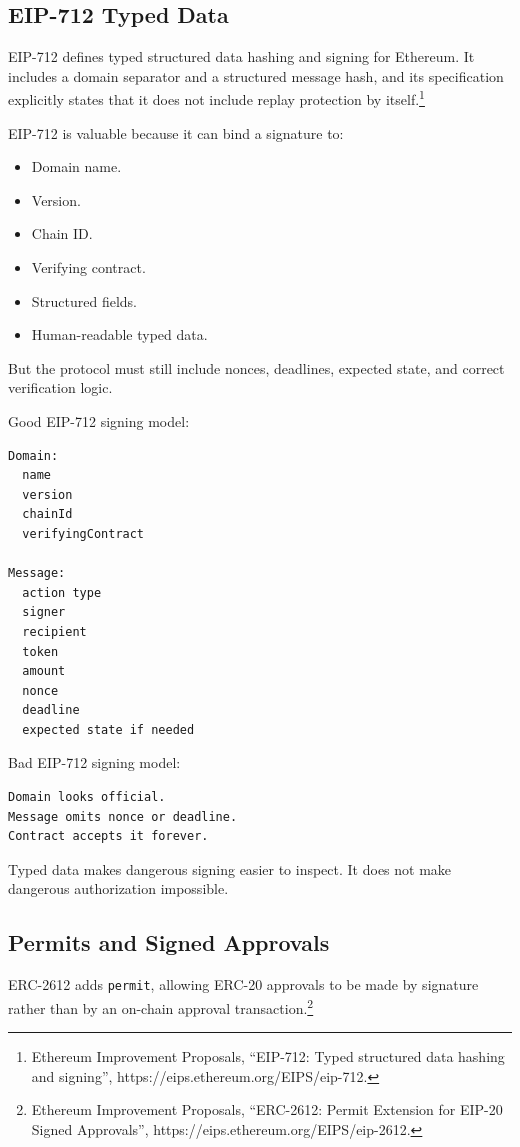 \subsection{EIP-712 Typed Data}

EIP-712 defines typed structured data hashing and signing for Ethereum.
It includes a domain separator and a structured message hash, and its
specification explicitly states that it does not include replay
protection by itself.\footnote{Ethereum Improvement Proposals,
  ``EIP-712: Typed structured data hashing and signing'',
  https://eips.ethereum.org/EIPS/eip-712.}

EIP-712 is valuable because it can bind a signature to:

\begin{itemize}
\tightlist
\item
  Domain name.
\item
  Version.
\item
  Chain ID.
\item
  Verifying contract.
\item
  Structured fields.
\item
  Human-readable typed data.
\end{itemize}

But the protocol must still include nonces, deadlines, expected state,
and correct verification logic.

Good EIP-712 signing model:

\begin{lstlisting}
Domain:
  name
  version
  chainId
  verifyingContract

Message:
  action type
  signer
  recipient
  token
  amount
  nonce
  deadline
  expected state if needed
\end{lstlisting}

Bad EIP-712 signing model:

\begin{lstlisting}
Domain looks official.
Message omits nonce or deadline.
Contract accepts it forever.
\end{lstlisting}

Typed data makes dangerous signing easier to inspect. It does not make
dangerous authorization impossible.

\subsection{Permits and Signed Approvals}

ERC-2612 adds \passthrough{\lstinline!permit!}, allowing ERC-20
approvals to be made by signature rather than by an on-chain approval
transaction.\footnote{Ethereum Improvement Proposals, ``ERC-2612: Permit
  Extension for EIP-20 Signed Approvals'',
  https://eips.ethereum.org/EIPS/eip-2612.}

